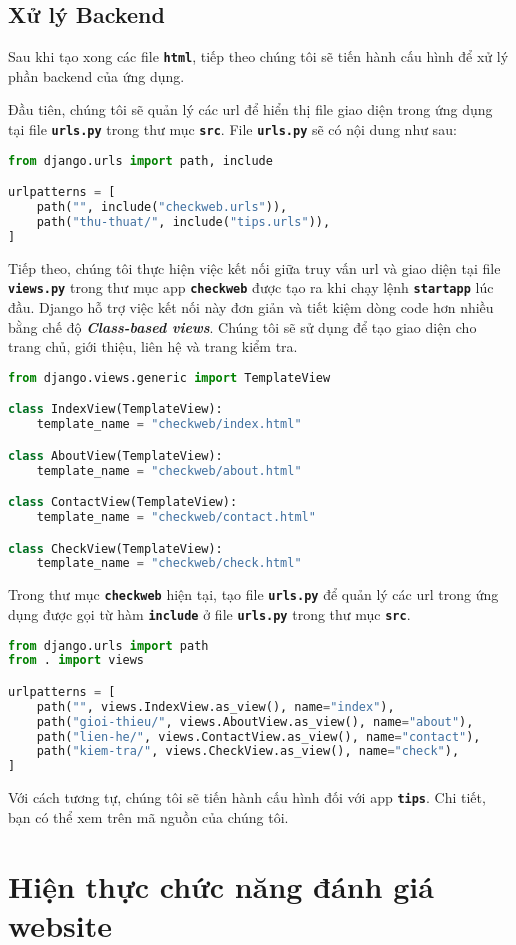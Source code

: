 \subsection{Xử lý Backend}
Sau khi tạo xong các file \textbf{\texttt{html}}, tiếp theo chúng tôi sẽ tiến hành cấu hình để xử lý phần backend của ứng dụng.
\par
Đầu tiên, chúng tôi sẽ quản lý các url để hiển thị file giao diện trong ứng dụng tại file \textbf{\texttt{urls.py}} trong thư mục \textbf{\texttt{src}}. File \textbf{\texttt{urls.py}} sẽ có nội dung như sau:
\begin{lstlisting}[language=Python]
from django.urls import path, include

urlpatterns = [
    path("", include("checkweb.urls")),
    path("thu-thuat/", include("tips.urls")),
]
\end{lstlisting}
\par
Tiếp theo, chúng tôi thực hiện việc kết nối giữa truy vấn url và giao diện tại file \textbf{\texttt{views.py}} trong thư mục app \textbf{\texttt{checkweb}} được tạo ra khi chạy lệnh \textbf{\texttt{startapp}} lúc đầu. Django hỗ trợ việc kết nối này đơn giản và tiết kiệm dòng code hơn nhiều bằng chế độ \textbf{\textit{Class-based views}}. Chúng tôi sẽ sử dụng để tạo giao diện cho trang chủ, giới thiệu, liên hệ và trang kiểm tra.
\begin{lstlisting}[language=Python]
from django.views.generic import TemplateView

class IndexView(TemplateView):
    template_name = "checkweb/index.html"

class AboutView(TemplateView):
    template_name = "checkweb/about.html"

class ContactView(TemplateView):
    template_name = "checkweb/contact.html"

class CheckView(TemplateView):
    template_name = "checkweb/check.html"
\end{lstlisting}
\par
Trong thư mục \textbf{\texttt{checkweb}} hiện tại, tạo file \textbf{\texttt{urls.py}} để quản lý các url trong ứng dụng được gọi từ hàm \textbf{\texttt{include}} ở file \textbf{\texttt{urls.py}} trong thư mục \textbf{\texttt{src}}.
\begin{lstlisting}[language=Python]
from django.urls import path
from . import views

urlpatterns = [
    path("", views.IndexView.as_view(), name="index"),
    path("gioi-thieu/", views.AboutView.as_view(), name="about"),
    path("lien-he/", views.ContactView.as_view(), name="contact"),
    path("kiem-tra/", views.CheckView.as_view(), name="check"),
]
\end{lstlisting}
\par
Với cách tương tự, chúng tôi sẽ tiến hành cấu hình đối với app \textbf{\texttt{tips}}. Chi tiết, bạn có thể xem trên mã nguồn của chúng tôi.
\section{Hiện thực chức năng đánh giá website}